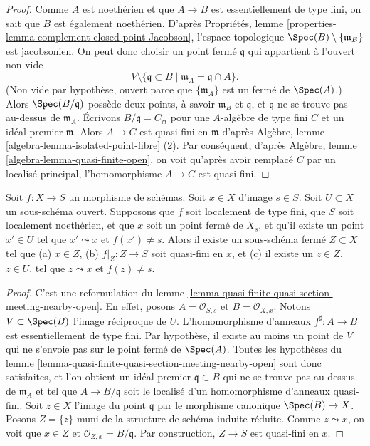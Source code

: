 \begin{proof}
Comme $A$ est noethérien et que $A \to B$ est essentiellement de type fini,
on sait que $B$ est également noethérien. D'après
Propriétés, lemme \ref{properties-lemma-complement-closed-point-Jacobson},
l'espace topologique $\Spec(B) \setminus \{\mathfrak m_B\}$
est jacobsonien. On peut donc choisir un point fermé $\mathfrak q$
qui appartient à l'ouvert non vide
$$
V \setminus \{\mathfrak q \subset B \mid \mathfrak m_A = \mathfrak q \cap A\}.
$$
(Non vide par hypothèse, ouvert parce que $\{\mathfrak m_A\}$ est un fermé
de $\Spec(A)$.)
Alors $\Spec(B/\mathfrak q)$ possède deux points, à savoir $\mathfrak m_B$
et $\mathfrak q$, et $\mathfrak q$ ne se trouve pas au-dessus de $\mathfrak m_A$.
Écrivons $B/\mathfrak q = C_{\mathfrak m}$ pour une $A$-algèbre de type fini
$C$ et un idéal premier $\mathfrak m$. Alors $A \to C$ est quasi-fini en
$\mathfrak m$ d'après
Algèbre, lemme \ref{algebra-lemma-isolated-point-fibre} (2).
Par conséquent, d'après
Algèbre, lemme \ref{algebra-lemma-quasi-finite-open},
on voit qu'après avoir remplacé $C$ par un localisé principal, l'homomorphisme
$A \to C$ est quasi-fini.
\end{proof}

\begin{lemma}
\label{lemma-quasi-finite-quasi-section-meeting-nearby-open-X}
Soit $f : X \to S$ un morphisme de schémas.
Soit $x \in X$ d'image $s \in S$.
Soit $U \subset X$ un sous-schéma ouvert.
Supposons que $f$ soit localement de type fini, que $S$ soit localement noethérien, et que $x$ soit un point fermé
de $X_s$, et qu'il existe un point $x' \in U$ tel que
$x' \leadsto x$ et $f(x') \not = s$. Alors il existe un sous-schéma fermé
$Z \subset X$ tel que (a) $x \in Z$, (b) $f|_Z : Z \to S$ soit
quasi-fini en $x$, et (c) il existe un $z \in Z$, $z \in U$,
tel que $z \leadsto x$ et $f(z) \not = s$.
\end{lemma}

\begin{proof}
C'est une reformulation du
lemme \ref{lemma-quasi-finite-quasi-section-meeting-nearby-open}.
En effet, posons $A = \mathcal{O}_{S, s}$ et $B = \mathcal{O}_{X, x}$.
Notons $V \subset \Spec(B)$ l'image réciproque de $U$.
L'homomorphisme d'anneaux $f^\sharp : A \to B$ est essentiellement de type fini.
Par hypothèse, il existe au moins un point de $V$ qui ne
s'envoie pas sur le point fermé de $\Spec(A)$. Toutes les hypothèses du
lemme \ref{lemma-quasi-finite-quasi-section-meeting-nearby-open}
sont donc satisfaites, et l'on obtient un idéal premier $\mathfrak q \subset B$ qui ne
se trouve pas au-dessus de $\mathfrak m_A$ et tel que $A \to B/\mathfrak q$ soit
le localisé d'un homomorphisme d'anneaux quasi-fini. Soit $z \in X$
l'image du point $\mathfrak q$ par le morphisme canonique
$\Spec(B) \to X$. Posons $Z = \overline{\{z\}}$
muni de la structure de schéma induite réduite. Comme $z \leadsto x$,
on voit que $x \in Z$ et $\mathcal{O}_{Z, x} = B/\mathfrak q$.
Par construction, $Z \to S$ est quasi-fini en $x$.
\end{proof}

